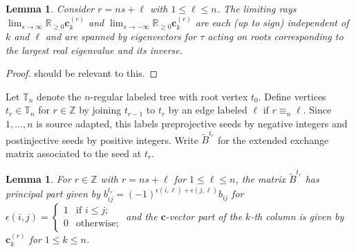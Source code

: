\documentclass{amsart}
\newtheorem{lemma}[theorem]{Lemma}
\numberwithin{theorem}{section}
\newcommand{\bfc}{\boldsymbol{c}}
\newcommand{\RR}{\mathbb{R}}
\newcommand{\TT}{\mathbb{T}}
\newcommand{\ZZ}{\mathbb{Z}}
\begin{document}
  \begin{lemma}
    Consider $r=ns+\ell$ with $1\le\ell\le n$.
    The limiting rays $\lim_{s\to\infty} \RR_{\ge0}\bfc^{(r)}_k$ and $\lim_{s\to-\infty} \RR_{\ge0}\bfc^{(r)}_k$ are each (up to sign) independent of $k$ and $\ell$ and are spanned by eigenvectors for $\tau$ acting on roots corresponding to the largest real eigenvalue and its inverse.
  \end{lemma}
  \begin{proof}
    \cite{Tak94} should be relevant to this.
  \end{proof}

  Let $\TT_n$ denote the $n$-regular labeled tree with root vertex $t_0$.
  Define vertices $t_r\in\TT_n$ for $r\in\ZZ$ by joining $t_{r-1}$ to $t_r$ by an edge labeled $\ell$ if $r\equiv_n\ell$.
  Since $1,\ldots,n$ is source adapted, this labels preprojective seeds by negative integers and postinjective seeds by positive integers.
  Write $\tilde B^{t_r}$ for the extended exchange matrix associated to the seed at $t_r$.
  \begin{lemma}
    \label{lem:transjective exchange matrices}
    For $r\in\ZZ$ with $r=ns+\ell$ for $1\le \ell \le n$, the matrix $\tilde B^{t_r}$ has principal part given by $b^{t_r}_{ij}=(-1)^{\epsilon(i,\ell)+\epsilon(j,\ell)}b_{ij}$ for $\epsilon(i,j)=\begin{cases} 1 & \text{if $i\le j$;}\\ 0 & \text{otherwise;}\end{cases}$ and the $\bfc$-vector part of the $k$-th column is given by $\bfc^{(r)}_k$ for $1\le k\le n$.
  \end{lemma}
\end{document}
